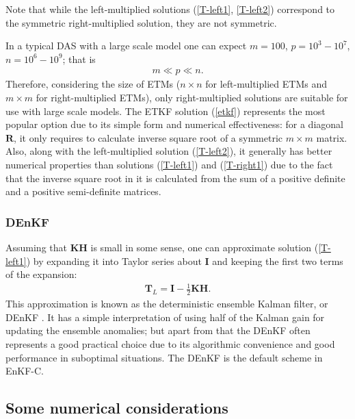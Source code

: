 \documentclass[11pt]{report}
\newcommand{\mb} {\mathbf}
\begin{document}
Note that while the left-multiplied solutions (\ref{T-left1}, \ref{T-left2}) correspond to the symmetric right-multiplied solution, they are not symmetric.

In a typical DAS with a large scale model one can expect $m = 100$, $p = 10^3-10^7$, $n = 10^6-10^9$; that is
\begin{align}
  m \ll p \ll n.
\end{align}
Therefore, considering the size of ETMs ($n \times n$ for left-multiplied ETMs and $m \times m$ for right-multiplied ETMs), only right-multiplied solutions are suitable for use with large scale models.
The ETKF solution (\ref{etkf}) represents the most popular option due to its simple form and numerical effectiveness: for a diagonal $\mb R$, it only requires to calculate inverse square root of a symmetric $m \times m$ matrix.
Also, along with the left-multiplied solution (\ref{T-left2}), it generally has better numerical properties than solutions (\ref{T-left1}) and (\ref{T-right1}) due to the fact that the inverse square root in it is calculated from the sum of a positive definite and a positive semi-definite matrices.

\subsubsection{DEnKF}

Assuming that $\mb K \mb H$ is small in some sense, one can approximate solution (\ref{T-left1}) by expanding it into Taylor series about $\mb I$ and keeping the first two terms of the expansion:
\begin{align}
  \label{denkf}
  \mb T_L = \mb I - \frac{1}{2} \mb K \mb H.
\end{align}
This approximation is known as the deterministic ensemble Kalman filter, or DEnKF \citep{sak08a}.
It has a simple interpretation of using half of the Kalman gain for updating the ensemble anomalies; but apart from that the DEnKF often represents a good practical choice due to its algorithmic convenience and good performance in suboptimal situations.
The DEnKF is the default scheme in EnKF-C.

\subsection{Some numerical considerations}
\label{sec:numerical}
\end{document}
